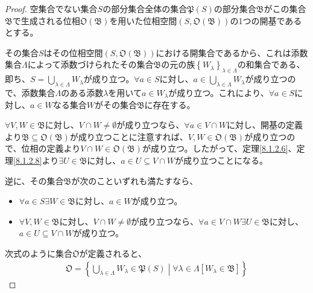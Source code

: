 \documentclass[dvipdfmx]{jsarticle}
\begin{document}
\begin{proof}
空集合でない集合$S$の部分集合全体の集合$\mathfrak{P}(S)$の部分集合$\mathfrak{B}$がこの集合$\mathfrak{B}$で生成される位相$\mathfrak{O}\left( \mathfrak{B} \right)$を用いた位相空間$\left( S,\mathfrak{O}\left( \mathfrak{B} \right) \right)$の1つの開基であるとする。\par
その集合$S$はその位相空間$\left( S,\mathfrak{O}\left( \mathfrak{B} \right) \right)$における開集合であるから、これは添数集合$\varLambda$によって添数づけられたその集合$\mathfrak{B}$の元の族$\left\{ W_{\lambda} \right\}_{\lambda \in \varLambda}$の和集合である、即ち、$S = \bigcup_{\lambda \in \varLambda} W_{\lambda}$が成り立つ。$\forall a \in S$に対し、$a \in \bigcup_{\lambda \in \varLambda} W_{\lambda}$が成り立つので、添数集合$\varLambda$のある添数$\lambda$を用いて$a \in W_{\lambda}$が成り立つ。これにより、$\forall a \in S$に対し、$a \in W$なる集合$W$がその集合$\mathfrak{B}$に存在する。\par
$\forall V,W \in \mathfrak{B}$に対し、$V \cap W \neq \emptyset$が成り立つなら、$\forall a \in V \cap W$に対し、開基の定義より$\mathfrak{B \subseteq O}\left( \mathfrak{B} \right)$が成り立つことに注意すれば、$V,W \in \mathfrak{O}\left( \mathfrak{B} \right)$が成り立つので、位相の定義より$V \cap W \in \mathfrak{O}\left( \mathfrak{B} \right)$が成り立つ。したがって、定理\ref{8.1.2.6}、定理\ref{8.1.2.8}より$\exists U \in \mathfrak{B}$に対し、$a \in U \subseteq V \cap W$が成り立つことになる。\par
逆に、その集合$\mathfrak{B}$が次のこといずれも満たすなら、
\begin{itemize}
\item
  $\forall a \in S\exists W \in \mathfrak{B}$に対し、$a \in W$が成り立つ。
\item
  $\forall V,W \in \mathfrak{B}$に対し、$V \cap W \neq \emptyset$が成り立つなら、$\forall a \in V \cap W\exists U \in \mathfrak{B}$に対し、$a \in U \subseteq V \cap W$が成り立つ。
\end{itemize}
次式のように集合$\mathfrak{O}$が定義されると、
\begin{align*}
\mathfrak{O} =\left\{ \bigcup_{\lambda \in \varLambda} W_{\lambda}\in \mathfrak{P}(S) \middle| \forall\lambda \in \varLambda\left[ W_{\lambda} \in \mathfrak{B} \right] \right\}
\end{align*}

\end{proof}
\end{document}

